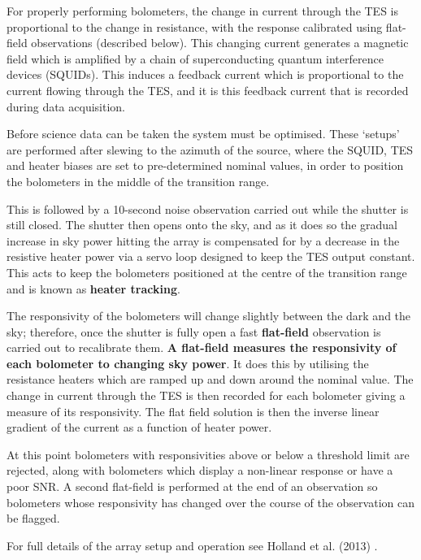 \documentclass[twoside,11pt]{article}
\renewcommand{\_}{\texttt{\symbol{95}}}
\begin{document}
For properly performing bolometers, the change in current through the
TES is proportional to the change in resistance, with the response
calibrated using flat-field observations (described below). This
changing current generates a magnetic field which is amplified by a
chain of superconducting quantum interference devices (SQUIDs). This
induces a feedback current which is proportional to the current
flowing through the TES, and it is this feedback current that is
recorded during data acquisition.

Before science data can be taken the system must be optimised. These
`setups' are performed after slewing to the azimuth of the source,
where the SQUID, TES and heater biases are set to pre-determined
nominal values, in order to position the bolometers in the middle of
the transition range.

This is followed by a 10-second noise observation carried out while
the shutter is still closed. The shutter then opens onto the sky, and
as it does so the gradual increase in sky power hitting the array is
compensated for by a decrease in the resistive heater power via a
servo loop designed to keep the TES output constant. This acts to keep
the bolometers positioned at the centre of the transition range and is
known as \textbf{heater tracking}.

The responsivity of the bolometers will change slightly between the
dark and the sky; therefore, once the shutter is fully open a fast
\textbf{flat-field} observation is carried out to recalibrate them.
\textbf{A flat-field measures the responsivity of each bolometer to
changing sky power}. It does this by utilising the resistance heaters
which are ramped up and down around the nominal value. The change in
current through the TES is then recorded for each bolometer giving a
measure of its responsivity. The flat field solution is then the
inverse linear gradient of the current as a function of heater power.

At this point bolometers with responsivities above or below a
threshold limit are rejected, along with bolometers which display a
non-linear response or have a poor SNR. A second flat-field is
performed at the end of an observation so bolometers whose
responsivity has changed over the course of the observation can be
flagged.

For full details of the array setup and operation see Holland et al.
(2013) \cite{s2main}.
\end{document}
